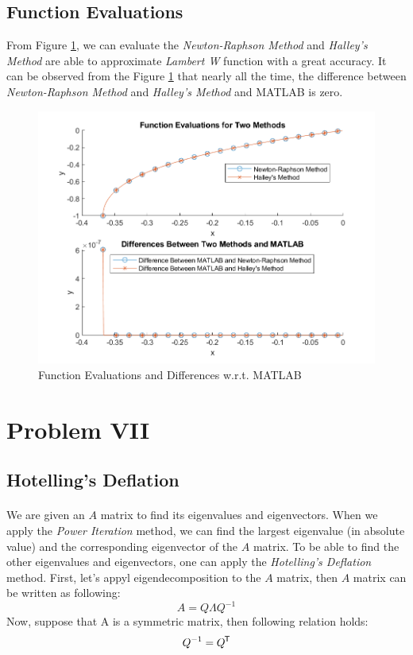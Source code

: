 \documentclass[letterpaper,12pt]{article}
\newcommand*{\tran}{^{\mkern-1.5mu\mathsf{T}}}
\begin{document}
   \subsection{Function Evaluations}
   From Figure \ref{fig:lambertfunceval}, we can evaluate the \textit{Newton-Raphson Method} and \textit{Halley's Method} are able to approximate \textit{Lambert W} function with a great accuracy. It can be observed from the Figure \ref{fig:lambertfunceval} that nearly all the time, the difference between \textit{Newton-Raphson Method} and \textit{Halley's Method} and MATLAB is zero.
   
\begin{figure}[H] 
   \centering \includegraphics[width=\columnwidth]{figures/lambertfunceval.png}           
                  \caption{Function Evaluations and Differences w.r.t. MATLAB}                
                     \label{fig:lambertfunceval}
   \end{figure}
\pagebreak
\section{Problem  VII}
\subsection{Hotelling's Deflation}
\paragraph{} We are given an $A$ matrix to find its eigenvalues and eigenvectors. When we apply the \textit{Power Iteration} method, we can find the largest eigenvalue (in absolute value) and the corresponding eigenvector of the $A$ matrix. To be able to find the other eigenvalues and eigenvectors, one can apply the \textit{Hotelling's Deflation} method. First, let's appyl eigendecomposition to the $A$ matrix, then $A$ matrix can be written as following:
\begin{equation*}
   A = Q \Lambda Q^{-1}
\end{equation*}
Now, suppose that A is a symmetric matrix, then following relation holds:
\begin{equation}
   \label{eqn:inveqtrans}
   Q^{-1} = Q \tran
\end{equation}
\end{document}
